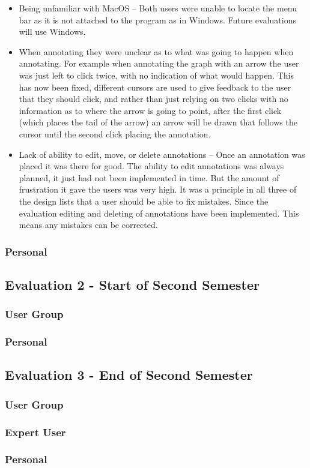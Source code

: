 \begin{itemize}
\item Being unfamiliar with MacOS -- Both users were unable to locate the menu bar as it is not attached to the program as in Windows.  Future evaluations will use Windows.
\item When annotating they were unclear as to what was going to happen when annotating.  For example when annotating the graph with an arrow the user was just left to click twice, with no indication of what would happen.  This has now been fixed, different cursors are used to give feedback to the user that they should click, and rather than just relying on two clicks with no information as to where the arrow is going to point, after the first click (which places the tail of the arrow) an arrow will be drawn that follows the cursor until the second click placing the annotation.
\item Lack of ability to edit, move, or delete annotations -- Once an annotation was placed it was there for good.  The ability to edit annotations was always planned, it just had not been implemented in time.  But the amount of frustration it gave the users was very high.  It was a principle in all three of the design lists that a user should be able to fix mistakes.  Since the evaluation editing and deleting of annotations have been implemented.  This means any mistakes can be corrected.
\end{itemize}


\subsubsection{Personal}

\subsection{Evaluation 2 - Start of Second Semester}
\subsubsection{User Group}
\subsubsection{Personal}

\subsection{Evaluation 3 - End of Second Semester}
\subsubsection{User Group}
\subsubsection{Expert User}
\subsubsection{Personal}
